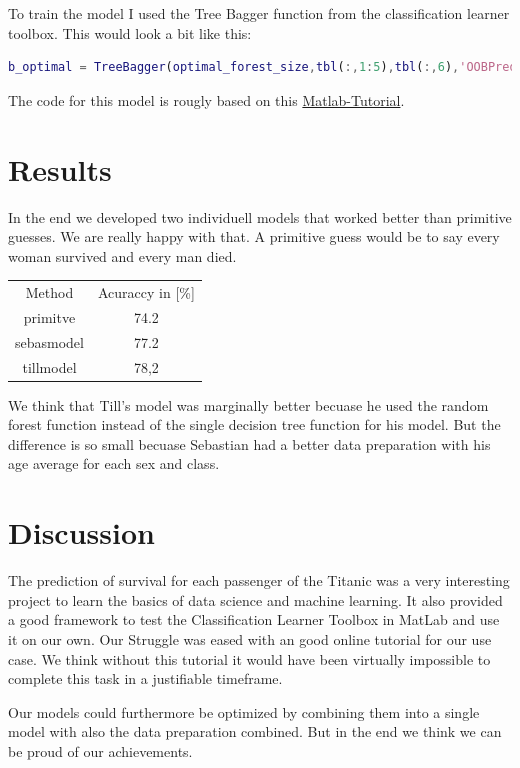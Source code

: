 \documentclass[
   10.5pt,
   invert-title=true,
   titlepage=false,
   titleimage-ratio=13,
   class=article
]{bfhpub}				%
\begin{document}
To train the model I used the Tree Bagger function from the classification learner toolbox. This would look a bit like this:
\begin{lstlisting}[language=Matlab]
b_optimal = TreeBagger(optimal_forest_size,tbl(:,1:5),tbl(:,6),'OOBPredictorImportance','off','OOBPrediction','on');
\end{lstlisting}
The code for this model is rougly based on this \href{https://blogs.mathworks.com/loren/2015/06/18/getting-started-with-kaggle-data-science-competitions/}{Matlab-Tutorial}.


\section*{Results}
In the end we developed two individuell models that worked better than primitive guesses. We are really happy with that. A primitive guess would be to say every woman survived and every man died.

\begin{center}
	\begin{tabular}{ c c }
		Method & Acuraccy in [\%] \\
		primitve & 74.2 \\ 
		sebasmodel & 77.2 \\
		tillmodel & 78,2    
	\end{tabular}
\end{center}
We think that Till's model was marginally better becuase he used the random forest function instead of the single decision tree function for his model. But the difference is so small becuase Sebastian had a better data preparation with his age average for each sex and class.

\section*{Discussion}
The prediction of survival for each passenger of the Titanic was a very interesting project to learn the basics of data science and machine learning. It also provided a good framework to test the Classification Learner Toolbox in MatLab and use it on our own. Our Struggle was eased with an good online tutorial for our use case. We think without this tutorial it would have been virtually impossible to complete this task in a justifiable timeframe.

Our models could furthermore be optimized by combining them into a single model with also the data preparation combined.
But in the end we think we can be proud of our achievements.



\end{document}

